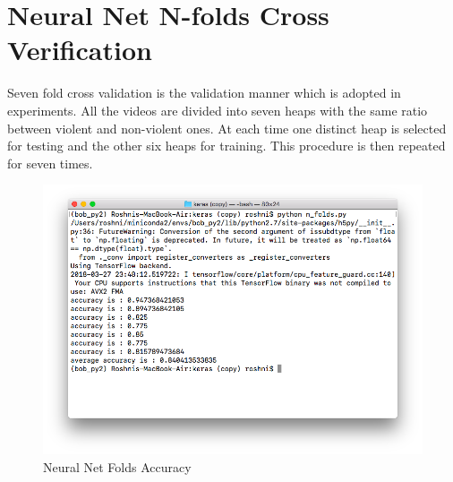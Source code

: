 \section{Neural Net N-folds Cross Verification}
Seven fold cross validation is the validation manner which is adopted in
experiments. All the videos are divided into seven heaps with the same ratio between
violent and non-violent ones. At each time one distinct heap is selected for testing and the other six heaps for training. This procedure is then repeated for seven times.
\begin{figure}[H]
\centering
\includegraphics[width = \linewidth]{84_nfolds_keras.png}
\caption{Neural Net Folds Accuracy}
\end{figure}
